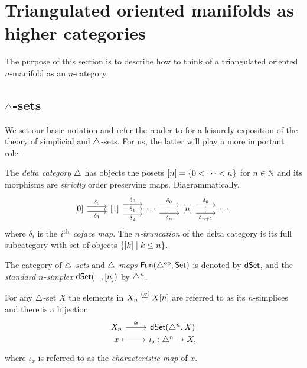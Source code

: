 
\section{Triangulated oriented manifolds as higher categories}

The purpose of this section is to describe how to think of a triangulated oriented $n$-manifold as an $n$-category.

\subsection{$\triangle$-sets}

We set our basic notation and refer the reader to \cite{friedman2021simplicial} for a leisurely exposition of the theory of simplicial and $\triangle$-sets.
For us, the latter will play a more important role.

The \textit{delta category} $\triangle$ has objects the posets $[n] = \{0 < \dots < n\}$ for $n \in \mathbb{N}$ and its morphisms are \textit{strictly} order preserving maps.
Diagrammatically,
\[
\begin{tikzcd}
	{[0]} \arrow[r,shift left=3pt, "\delta_0"] \arrow[r,shift right=3pt, "\delta_1"'] &
	{[1]} \arrow[r,shift left=6pt, "\delta_0"] \arrow[r, "\delta_1"' description] \arrow[r,shift right=6pt, "\delta_2"'] &
	\dotsb
	\arrow[r,shift left=5pt, "\delta_0"] \arrow[r,shift right=5pt, "\delta_n"', "\scalebox{0.6}{$\vdots$}"] &
	{[n]}
	\arrow[r,shift left=5pt, "\delta_0"] \arrow[r,shift right=5pt, "\delta_{n+1}"', "\scalebox{0.6}{$\vdots$}"] &
	\dotsb \
\end{tikzcd}
\]
where $\delta_i$ is the $i^{\mathrm{th}}$ \textit{coface map}.
The \textit{$n$-truncation} of the delta category is its full subcategory with set of objects $\{[k] \mid k \leq n\}$.

The category of \textit{$\triangle$-sets} and \textit{$\triangle$-maps} $\mathsf{Fun}(\triangle^{\mathrm{op}}, \mathsf{Set})$ is denoted by $\mathsf{dSet}$, and the \textit{standard $n$-simplex} $\mathsf{dSet}(-, [n])$ by $\triangle^n$.

For any $\triangle$-set $X$ the elements in $X_n \stackrel{\mathrm{def}}{=} X[n]$ are referred to as its $n$-simplices and there is a bijection
\[
\begin{tikzcd}[row sep=-2pt]
	X_n \arrow[r,"\cong"] & \dSet(\simplex^n, X) \\
	x \arrow[r,mapsto] & \iota_x \colon \simplex^n \to X,
\end{tikzcd}
\]
where $\iota_x$ is referred to as the \textit{characteristic map} of $x$.

